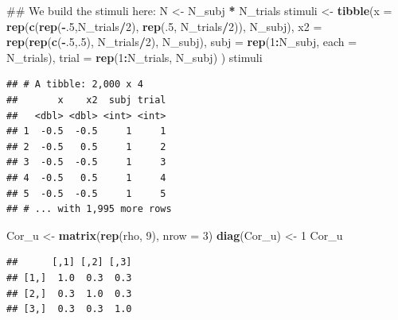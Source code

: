 \documentclass[12pt,]{krantz}
\newenvironment{Shaded}{\begin{snugshade}}{\end{snugshade}}
\newcommand{\KeywordTok}[1]{\textcolor[rgb]{0.13,0.29,0.53}{\textbf{#1}}}
\newcommand{\DataTypeTok}[1]{\textcolor[rgb]{0.13,0.29,0.53}{#1}}
\newcommand{\DecValTok}[1]{\textcolor[rgb]{0.00,0.00,0.81}{#1}}
\newcommand{\StringTok}[1]{\textcolor[rgb]{0.31,0.60,0.02}{#1}}
\newcommand{\OperatorTok}[1]{\textcolor[rgb]{0.81,0.36,0.00}{\textbf{#1}}}
\newcommand{\NormalTok}[1]{#1}
\theoremstyle{definition}
\theoremstyle{definition}
\theoremstyle{definition}
\theoremstyle{remark}
\begin{document}
\begin{Shaded}
\begin{Highlighting}[]
\NormalTok{## We build the stimuli here:}
\NormalTok{N <-}\StringTok{ }\NormalTok{N_subj }\OperatorTok{*}\StringTok{ }\NormalTok{N_trials}
\NormalTok{stimuli <-}\StringTok{ }\KeywordTok{tibble}\NormalTok{(}\DataTypeTok{x =} \KeywordTok{rep}\NormalTok{(}\KeywordTok{c}\NormalTok{(}\KeywordTok{rep}\NormalTok{(}\OperatorTok{-}\NormalTok{.}\DecValTok{5}\NormalTok{,N_trials}\OperatorTok{/}\DecValTok{2}\NormalTok{), }\KeywordTok{rep}\NormalTok{(.}\DecValTok{5}\NormalTok{, N_trials}\OperatorTok{/}\DecValTok{2}\NormalTok{)), N_subj),}
                  \DataTypeTok{x2 =} \KeywordTok{rep}\NormalTok{(}\KeywordTok{rep}\NormalTok{(}\KeywordTok{c}\NormalTok{(}\OperatorTok{-}\NormalTok{.}\DecValTok{5}\NormalTok{,.}\DecValTok{5}\NormalTok{), N_trials}\OperatorTok{/}\DecValTok{2}\NormalTok{), N_subj),}
                  \DataTypeTok{subj =} \KeywordTok{rep}\NormalTok{(}\DecValTok{1}\OperatorTok{:}\NormalTok{N_subj, }\DataTypeTok{each =}\NormalTok{ N_trials),}
                  \DataTypeTok{trial =} \KeywordTok{rep}\NormalTok{(}\DecValTok{1}\OperatorTok{:}\NormalTok{N_trials, N_subj)}
\NormalTok{                  )}
\NormalTok{stimuli}
\end{Highlighting}
\end{Shaded}

\begin{verbatim}
## # A tibble: 2,000 x 4
##       x    x2  subj trial
##   <dbl> <dbl> <int> <int>
## 1  -0.5  -0.5     1     1
## 2  -0.5   0.5     1     2
## 3  -0.5  -0.5     1     3
## 4  -0.5   0.5     1     4
## 5  -0.5  -0.5     1     5
## # ... with 1,995 more rows
\end{verbatim}

\begin{Shaded}
\begin{Highlighting}[]
\NormalTok{Cor_u <-}\StringTok{ }\KeywordTok{matrix}\NormalTok{(}\KeywordTok{rep}\NormalTok{(rho, }\DecValTok{9}\NormalTok{), }\DataTypeTok{nrow =} \DecValTok{3}\NormalTok{)}
\KeywordTok{diag}\NormalTok{(Cor_u) <-}\StringTok{ }\DecValTok{1}
\NormalTok{Cor_u}
\end{Highlighting}
\end{Shaded}

\begin{verbatim}
##      [,1] [,2] [,3]
## [1,]  1.0  0.3  0.3
## [2,]  0.3  1.0  0.3
## [3,]  0.3  0.3  1.0
\end{verbatim}
\end{document}
